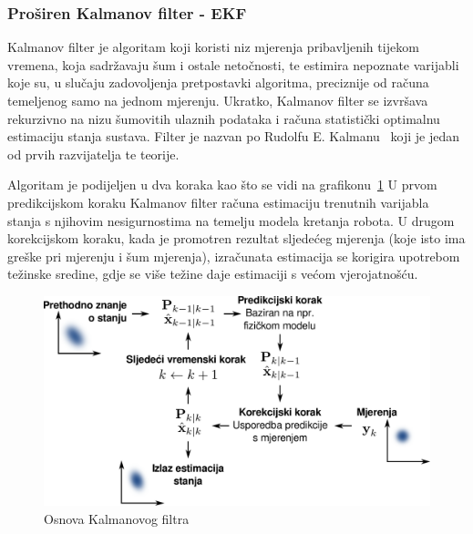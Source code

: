 \newpage
\subsubsection{Proširen Kalmanov filter - EKF} %
\label{ssub:Proširen Kalmanov filter - EKF}

Kalmanov filter je algoritam koji koristi niz mjerenja pribavljenih
tijekom vremena, koja sadržavaju šum i ostale netočnosti, te 
estimira nepoznate varijabli koje su, u slučaju zadovoljenja
pretpostavki algoritma, preciznije od računa temeljenog samo na jednom
mjerenju. Ukratko, Kalmanov filter se izvršava rekurzivno na nizu
šumovitih ulaznih podataka i računa statistički optimalnu estimaciju
stanja sustava. Filter je nazvan po Rudolfu E. Kalmanu~\cite{Kalman}
koji je jedan od prvih razvijatelja te teorije.


Algoritam je podijeljen u dva koraka kao što se vidi na
grafikonu~\ref{fig:basic-kalman} U prvom predikcijskom koraku Kalmanov
filter računa estimaciju trenutnih varijabla stanja s njihovim
nesigurnostima na temelju modela kretanja robota. U drugom korekcijskom
koraku, kada je promotren rezultat sljedećeg mjerenja (koje isto ima
greške pri mjerenju i šum mjerenja), izračunata estimacija se korigira
upotrebom težinske sredine, gdje se više težine daje estimaciji s većom
vjerojatnošću.

\begin{figure}[H]
\centering
\renewcommand{\figurename}{Grafikon}
\includegraphics[scale=0.35]{figures/basic-kalman.pdf}
\caption[]{Osnova Kalmanovog filtra\footnotemark[1]}
\label{fig:basic-kalman}
\end{figure}


